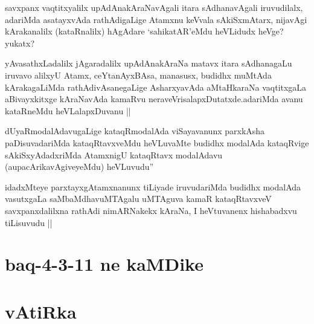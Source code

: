 \begin{artha}
savxpanx vaqtitxyalilx upAdAnakAraNavAgali itara sAdhanavAgali iruvudilalx, adariMda asatayxvAda rathAdigaLige Atamxnu keVvala sAkiSxmAtarx, nijavAgi kArakanalilx (kataRnalilx) hAgAdare `sahikatAR'eMdu heVLidudx heVge? yukatx?
\end{artha}

\begin{artha}
yAvasathxLadalilx jAgaradalilx upAdAnakAraNa matavx itara sAdhanagaLu iruvavo alilxyU Atamx, ceYtanAyxBAsa, manasusx, budidhx muMtAda kArakagaLiMda rathAdivAsanegaLige AsharxyavAda aMtaHkaraNa vaqtitxgaLa aBivayxkitxge kAraNavAda kamaRvu neraveVrisalapxDutatxde.adariMda avanu kataRneMdu heVLalapxDuvanu ||
\end{artha}


\begin{artha}
dUyaRmodalAdavugaLige kataqRmodalAda viSayavanunx parxkAsha paDisuvadariMda kataqRtavxveMdu heVLuvaMte budidhx modalAda kataqRvige sAkiSxyAdadxriMda AtamxnigU kataqRtavx modalAdavu (aupacArikavAgiveyeMdu) heVLuvudu''
\end{artha}


\begin{artha}
idadxMteye parxtayxgAtamxnanunx tiLiyade iruvudariMda budidhx modalAda vasutxgaLa saMbaMdhavuMTAgalu uMTAguva kamaR kataqRtavxveV savxpanxdalilxna rathAdi nimARNakekx  kAraNa, I heVtuvanenx hishabadxvu tiLisuvudu ||
\end{artha}

\section*{baq-4-3-11 ne kaMDike}

\section*{vAtiRka}

